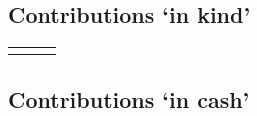 \vspace{1\baselineskip}


\subsection{Contributions `in kind'}\label{sec:inkind}

\begin{tabular}[c]{|o{3.6cm}|p{6.5cm}|o{4.6cm}|}
    \hline
    &\centering{}&\\
    \hline
     & \\
    \hline
\end{tabular}


\subsection{Contributions `in cash'}\label{sec:incash}

